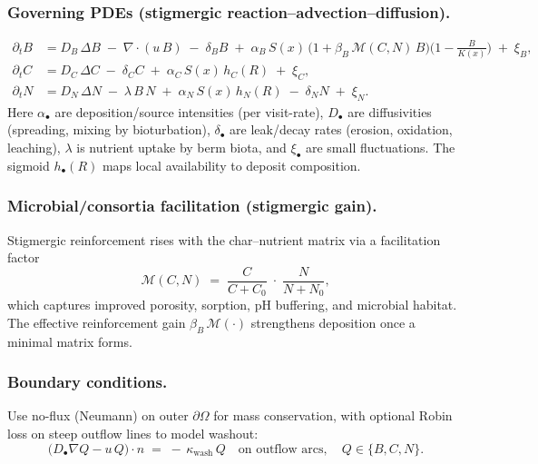 \documentclass{article}
\begin{document}
\subsubsection{Governing PDEs (stigmergic reaction–advection–diffusion).}
\begin{align}
\partial_t B
&= D_B\,\Delta B \;-\;\nabla\!\cdot(u\,B)\;-\;\delta_B B
\;+\; \alpha_B\,S(x)\,\Big(1+\beta_B\,\mathcal{M}(C,N)\,B\Big)\Big(1-\frac{B}{K(x)}\Big)
\;+\;\xi_B, \label{eq:berm}\\[2pt]
\partial_t C
&= D_C\,\Delta C \;-\;\delta_C C \;+\;\alpha_C\,S(x)\,h_C(R)\;+\;\xi_C, \label{eq:char}\\[2pt]
\partial_t N
&= D_N\,\Delta N \;-\;\lambda\,B\,N \;+\;\alpha_N\,S(x)\,h_N(R)\;-\;\delta_N N \;+\;\xi_N. \label{eq:nutr}
\end{align}
Here $\alpha_{\bullet}$ are deposition/source intensities (per visit-rate), $D_{\bullet}$ are diffusivities (spreading, mixing by bioturbation), $\delta_{\bullet}$ are leak/decay rates (erosion, oxidation, leaching), $\lambda$ is nutrient uptake by berm biota, and $\xi_{\bullet}$ are small fluctuations. The sigmoid $h_{\bullet}(R)$ maps local availability to deposit composition.

\subsubsection{Microbial/consortia facilitation (stigmergic gain).}
Stigmergic reinforcement rises with the char–nutrient matrix via a facilitation factor
\[
\mathcal{M}(C,N)\;=\;\frac{C}{C+C_0}\;\cdot\;\frac{N}{N+N_0},
\]
which captures improved porosity, sorption, pH buffering, and microbial habitat. The effective reinforcement gain $\beta_B\,\mathcal{M}(\cdot)$ strengthens deposition once a minimal matrix forms.

\subsubsection{Boundary conditions.}
Use no-flux (Neumann) on outer $\partial\Omega$ for mass conservation, with optional Robin loss on steep outflow lines to model washout:
\[
\big(D_{\bullet}\nabla Q - u\,Q\big)\cdot n\;=\;-\,\kappa_{\mathrm{wash}}\,Q\quad\text{on outflow arcs},\quad Q\in\{B,C,N\}.
\]
\end{document}

